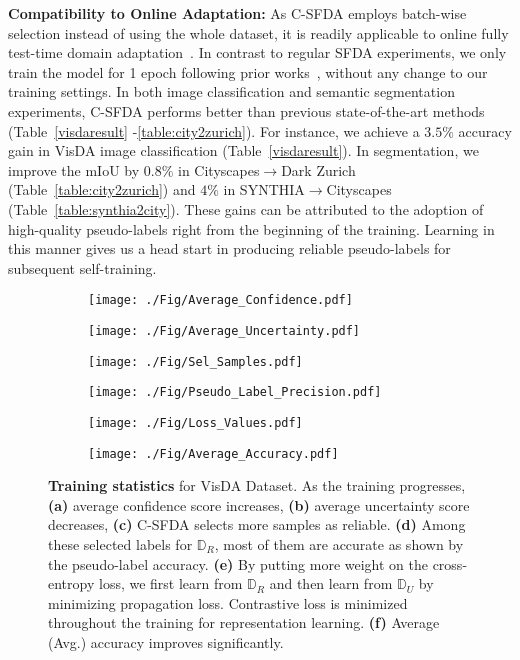 \documentclass[10pt,twocolumn,letterpaper]{article}
\begin{document}
\vspace{0.6mm}
\noindent \textbf{Compatibility to Online Adaptation:} As C-SFDA employs batch-wise selection instead of using the whole dataset, it is readily applicable to online fully test-time domain adaptation~\cite{wang2021tent,prabhu2022augmentation}. In contrast to regular SFDA experiments, we only train the model for 1 epoch following prior works~\cite{wang2021tent, prabhu2022augmentation}, without any change to our training settings. In both image classification and semantic segmentation experiments, C-SFDA performs better than previous state-of-the-art methods (Table~\ref{visdaresult} -\ref{table:city2zurich}). For instance, we achieve a $3.5\%$ accuracy gain in VisDA image classification (Table~\ref{visdaresult}). In segmentation, we improve the mIoU by $0.8\%$ in Cityscapes$\to$Dark Zurich (Table~\ref{table:city2zurich}) and $4\%$ in  SYNTHIA$\to$Cityscapes (Table~\ref{table:synthia2city}). These gains can be attributed to the adoption of high-quality pseudo-labels right from the beginning of the training. Learning in this manner gives us a head start in producing reliable pseudo-labels for subsequent self-training.
\begin{figure}[htb]
  \centering
  \begin{subfigure}{0.48\linewidth}
    \texttt{[image: ./Fig/Average\_Confidence.pdf]}
\end{subfigure}
\begin{subfigure}{0.48\linewidth}
    \texttt{[image: ./Fig/Average\_Uncertainty.pdf]}
\end{subfigure}
  \begin{subfigure}{0.48\linewidth}
    \texttt{[image: ./Fig/Sel\_Samples.pdf]}
\end{subfigure}
\begin{subfigure}{0.48\linewidth}
    \texttt{[image: ./Fig/Pseudo\_Label\_Precision.pdf]}
\end{subfigure}
  \begin{subfigure}{0.48\linewidth}
    \texttt{[image: ./Fig/Loss\_Values.pdf]}
\end{subfigure}
\begin{subfigure}{0.48\linewidth}
    \texttt{[image: ./Fig/Average\_Accuracy.pdf]}
\end{subfigure}
  \vspace{-1.5mm}
  \caption{\footnotesize \textbf{Training statistics} for {VisDA Dataset}. As the training progresses, \textbf{(a)} average confidence score increases, \textbf{(b)} average uncertainty score decreases, \textbf{(c)} C-SFDA selects more samples as reliable. \textbf{(d)} Among these selected labels for $\mathbb{D}_R$, most of them are accurate as shown by the pseudo-label accuracy. \textbf{(e)} By putting more weight on the cross-entropy loss, we first learn from $\mathbb{D}_R$ and then learn from $\mathbb{D}_U$ by minimizing propagation loss. Contrastive loss is minimized throughout the training for representation learning.  \textbf{(f)} Average (Avg.) accuracy improves significantly.} 
\vspace{-2mm}
  \label{fig:sup:train_stats}
\end{figure}
\end{document}

